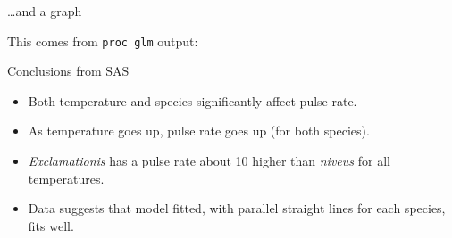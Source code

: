 \documentclass[unknownkeysallowed]{beamer}\usepackage[]{graphicx}\usepackage[]{color}
\begin{document}
\begin{frame}[fragile]{\ldots and a graph}
  
  This comes from \texttt{proc glm} output:
  
  
\end{frame}

\begin{frame}[fragile]{Conclusions from SAS}
  
  \begin{itemize}
  \item Both temperature and species significantly affect pulse rate. 
  \item As temperature goes up, pulse rate goes up (for both species).
    
  \item \textsl{Exclamationis} has a pulse rate about 10 higher than
    \textsl{niveus} for all temperatures.
  \item Data suggests that model fitted, with parallel straight lines
    for each species, fits well.
  \end{itemize}
  
\end{frame}
\end{document}
